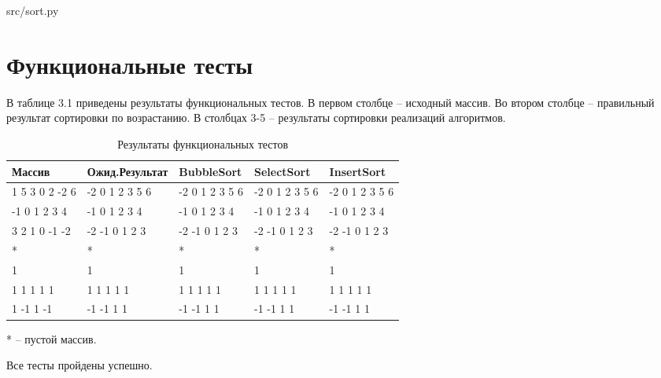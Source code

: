 \begin{lstinputlisting}[language=Python, caption=Реализация алгоритма сортировки выбором, linerange={23-33}, 
	basicstyle=\small\sffamily, frame=single]{src/sort.py}
\end{lstinputlisting}

\clearpage

\section{Функциональные тесты}
В таблице 3.1 приведены результаты функциональных тестов. 
В первом столбце -- исходный массив.
Во втором столбце -- правильный результат сортировки по возрастанию.
В столбцах 3-5 -- результаты сортировки реализаций алгоритмов.

\begin{table}[h]
	\caption{Результаты функциональных тестов}
	\centering
	\begin{tabular}{ | l | l | l | l | l | }
		\hline
		Массив & Ожид.Результат  & BubbleSort & SelectSort & InsertSort \\ \hline
		1 5 3 0 2 -2 6 & -2 0 1 2 3 5 6 & -2 0 1 2 3 5 6 & -2 0 1 2 3 5 6 & -2 0 1 2 3 5 6 \\
		-1 0 1 2 3 4 & -1 0 1 2 3 4 & -1 0 1 2 3 4 & -1 0 1 2 3 4 & -1 0 1 2 3 4 \\
		3 2 1 0 -1 -2 & -2 -1 0 1 2 3 & -2 -1 0 1 2 3 & -2 -1 0 1 2 3 & -2 -1 0 1 2 3\\
		* & * & * & *  & * \\
		1 & 1 & 1 & 1 & 1 \\
		1 1 1 1 1 & 1 1 1 1 1 & 1 1 1 1 1 & 1 1 1 1 1 & 1 1 1 1 1 \\
		1 -1 1 -1 & -1 -1 1 1 & -1 -1 1 1 & -1 -1 1 1 & -1 -1 1 1\\
		\hline
	\end{tabular}
\end{table}

* -- пустой массив.

Все тесты пройдены успешно.

